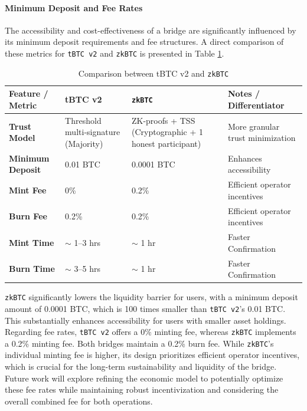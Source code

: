 \documentclass{DESSThesis}
\newcommand{\zktoken}{\texttt{zkBTC}}
\begin{document}
\paragraph{Minimum Deposit and Fee Rates}
The accessibility and cost-effectiveness of a bridge are significantly influenced by its minimum deposit requirements and fee structures. A direct comparison of these metrics for \texttt{tBTC v2} and \texttt{\zktoken} is presented in Table \ref{tab:bridge_comparison}.

\begin{table}[h!]
\centering
\begin{tabularx}{\textwidth}{|X|X|X|X|}
\hline
\textbf{Feature / Metric} & \textbf{tBTC v2} & \textbf{\zktoken} & \textbf{Notes / Differentiator} \\
\hline
\textbf{Trust Model} & Threshold multi-signature (Majority) & ZK-proofs + TSS (Cryptographic + 1 honest participant) & More granular trust minimization \\
\hline
\textbf{Minimum Deposit} & 0.01 BTC & 0.0001 BTC & Enhances accessibility \\
\hline
\textbf{Mint Fee} & 0\% & 0.2\% & Efficient operator incentives \\
\hline
\textbf{Burn Fee} & 0.2\% & 0.2\% & Efficient operator incentives \\
\hline
\textbf{Mint Time} & \(\sim\) 1--3 hrs & \(\sim\) 1 hr & Faster Confirmation \\
\hline
\textbf{Burn Time} & \(\sim\) 3--5 hrs & \(\sim\) 1 hr & Faster Confirmation \\
\hline
\end{tabularx}
\caption{Comparison between tBTC v2 and \zktoken}
\label{tab:bridge_comparison}
\end{table}

\texttt{\zktoken} significantly lowers the liquidity barrier for users, with a minimum deposit amount of 0.0001 BTC, which is 100 times smaller than \texttt{tBTC v2}'s 0.01 BTC. This substantially enhances accessibility for users with smaller asset holdings. Regarding fee rates, \texttt{tBTC v2} offers a 0\% minting fee, whereas \texttt{\zktoken} implements a 0.2\% minting fee. Both bridges maintain a 0.2\% burn fee. While \texttt{\zktoken}'s individual minting fee is higher, its design prioritizes efficient operator incentives, which is crucial for the long-term sustainability and liquidity of the bridge. Future work will explore refining the economic model to potentially optimize these fee rates while maintaining robust incentivization and considering the overall combined fee for both operations.
\end{document}
